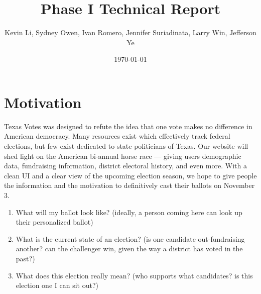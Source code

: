 \documentclass[11t]{article}
\title{Phase I Technical Report}
\author{Kevin Li, Sydney Owen, Ivan Romero, Jennifer Suriadinata, Larry Win, Jefferson Ye}
\date{\today}
\begin{document}
\begin{titlepage}
    \maketitle
\end{titlepage}

\section{Motivation}
Texas Votes was designed to refute the idea that one vote makes no difference in American democracy. Many resources exist which effectively track federal elections, but few exist dedicated to state politicians of Texas. Our website will shed light on the American bi-annual horse race — giving users demographic data, fundraising information, district electoral history, and even more. With a clean UI and a clear view of the upcoming election season, we hope to give people the information and the motivation to definitively cast their ballots on November 3.
\begin{enumerate}
    \item What will my ballot look like? (ideally, a person coming here can look up their personalized ballot)
    \item What is the current state of an election? (is one candidate out-fundraising another? can the challenger win, given the way a district has voted in the past?)
    \item What does this election really mean? (who supports what candidates? is this election one I can sit out?)
\end{enumerate}
\end{document}
